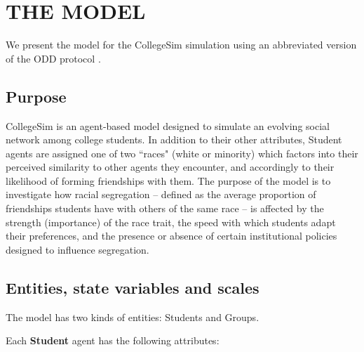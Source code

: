 
\section{THE MODEL}
\label{sec:model}

We present the model for the CollegeSim simulation using an abbreviated
version of the ODD protocol \cite[Grimm \textit{et al.} 2008]{polhill_using_2008}.

\subsection{Purpose}

CollegeSim is an agent-based model designed to simulate an evolving social
network among college students. In addition to their other attributes, Student
agents are assigned one of two ``races" (white or minority) which factors into
their perceived similarity to other agents they encounter, and accordingly to
their likelihood of forming friendships with them. The purpose of the model is
to investigate how racial segregation -- defined as the average proportion of
friendships students have with others of the same race -- is affected by the
strength (importance) of the race trait, the speed with which students adapt
their preferences, and the presence or absence of certain institutional
policies designed to influence segregation.

\subsection{Entities, state variables and scales}

The model has two kinds of entities: Students and Groups.


\vspace{.1in}
Each \textbf{Student} agent has the following attributes:

